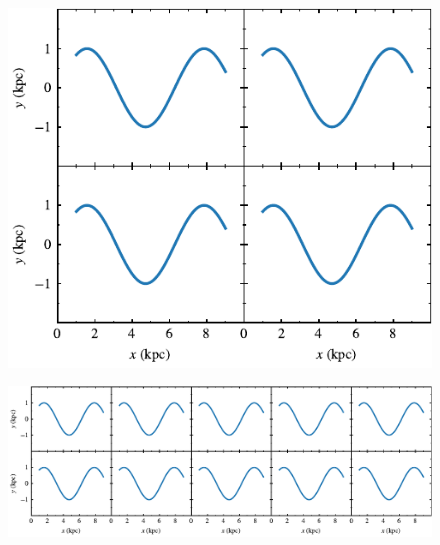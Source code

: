 \documentclass[usenatbib]{mnras}
\begin{document}
\lipsum[1-3]

\begin{figure}
\includegraphics{../pdf/002.pdf}
\caption[]{\lipsum[66]}
\label{fig002}
\end{figure}

\lipsum[1-3]

\begin{figure}
\includegraphics{../pdf/003.pdf}
\caption[]{\lipsum[66]}
\label{fig003}
\end{figure}

\lipsum[1-3]
\end{document}
